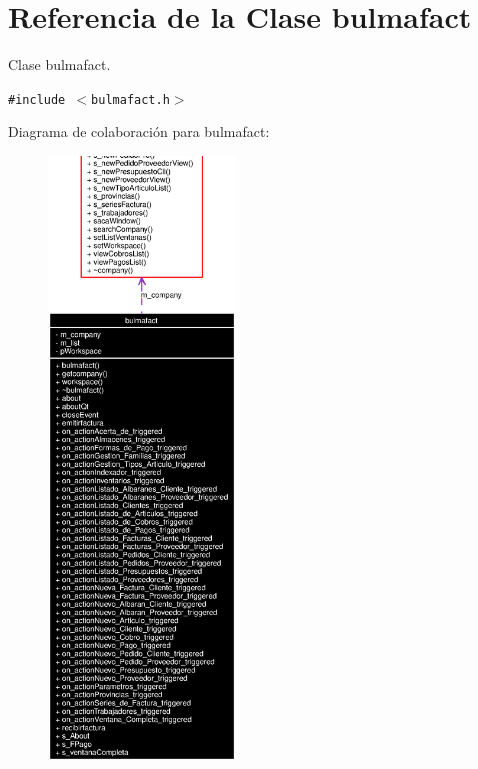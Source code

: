 \section{Referencia de la Clase bulmafact}
\label{classbulmafact}
Clase bulmafact.  


{\tt \#include $<$bulmafact.h$>$}

Diagrama de colaboraci\'{o}n para bulmafact:\begin{figure}[H]
\begin{center}
\leavevmode
\includegraphics[width=141pt]{classbulmafact__coll__graph}
\end{center}
\end{figure}
